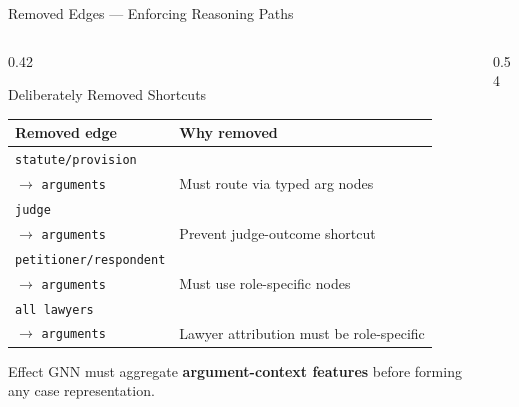 \documentclass[aspectratio=169, 9pt]{beamer}
\begin{document}
\begin{frame}{Removed Edges — Enforcing Reasoning Paths}
  \begin{columns}[T]
    \begin{column}{0.42\textwidth}
      \begin{block}{Deliberately Removed Shortcuts}
        \scriptsize\renewcommand{\arraystretch}{1.2}
        \begin{tabular}{p{3.0cm}p{2.8cm}}
          \toprule
          \textbf{Removed edge} & \textbf{Why removed}\\
          \midrule
          \texttt{statute/provision}\\$\to$ \texttt{arguments}
            & Must route via typed arg nodes\\[4pt]
          \texttt{judge}\\$\to$ \texttt{arguments}
            & Prevent judge-outcome shortcut\\[4pt]
          \texttt{petitioner/respondent}\\$\to$ \texttt{arguments}
            & Must use role-specific nodes\\[4pt]
          \texttt{all lawyers}\\$\to$ \texttt{arguments}
            & Lawyer attribution must be role-specific\\
          \bottomrule
        \end{tabular}
      \end{block}
      \vspace{4pt}
      \begin{alertblock}{Effect}
        \small GNN must aggregate \textbf{argument-context features} before forming any case representation.
      \end{alertblock}
    \end{column}
    \begin{column}{0.54\textwidth}
      \centering
\end{column}
\end{columns}
\end{frame}
\end{document}
